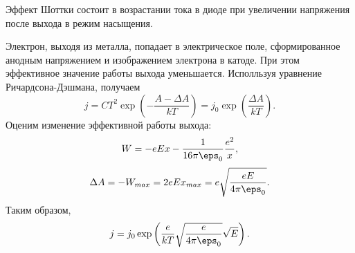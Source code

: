 Эффект Шоттки состоит в возрастании тока в диоде при увеличении напряжения после
выхода в режим насыщения.

Электрон, выходя из металла, попадает в электрическое поле, сформированное
анодным напряжением и изображением электрона в катоде. При этом эффективное
значение работы выхода уменьшается. Исполльзуя уравнение Ричардсона-Дэшмана,
получаем
\[
    j = CT^2\exp\left(-\frac{A-\Delta A}{kT}\right) =
    j_0\exp\left(\frac{\Delta A}{kT}\right).
\]
Оценим изменение эффективной работы выхода:
\[
    W = -eEx - \frac{1}{16\pi\eps_0}\frac{e^2}{x},
\]
\[
    \Delta A = -W_{max} = 2eEx_{max} = e\sqrt{\frac{eE}{4\pi\eps_0}}.
\]
Таким образом,
\[
    j = j_0\exp\left(\frac{e}{kT}\sqrt{\frac{e}{4\pi\eps_0}}\sqrt{E}\right).
\]
